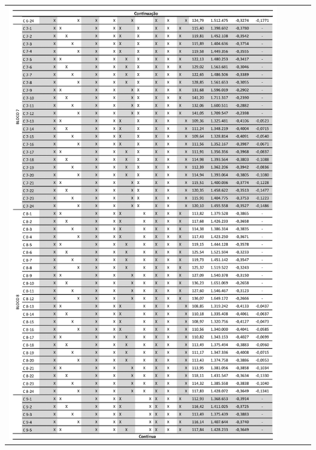 \begin{table}[H]
    \centering
    \begin{tabular}{l}
        \includegraphics[width=0.9\textwidth]{figures/appendices/tabela07.png}
    \end{tabular}
\end{table}
\pagebreak
